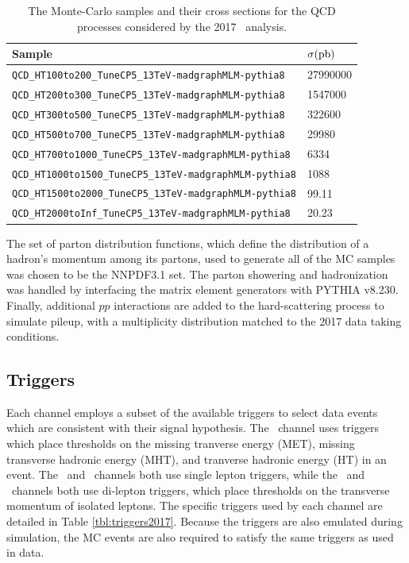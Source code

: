 \begin{table}[htbp]
  \caption[QCD Samples for \VHbb\ 2017]{The Monte-Carlo samples and their cross sections for the QCD processes considered by the 2017 \VHbb\ analysis.}
  \label{tbl:MCQCD}
  \begin{tabularx}{6.5in}{lX}
    \hline
    Sample                                                         & $\sigma (\mathrm{pb})$ \\
    \hline
    \texttt{QCD\_HT100to200\_TuneCP5\_13TeV-madgraphMLM-pythia8}   & 27990000       \\
    \texttt{QCD\_HT200to300\_TuneCP5\_13TeV-madgraphMLM-pythia8}   & 1547000        \\
    \texttt{QCD\_HT300to500\_TuneCP5\_13TeV-madgraphMLM-pythia8}   & 322600         \\
    \texttt{QCD\_HT500to700\_TuneCP5\_13TeV-madgraphMLM-pythia8}   & 29980          \\
    \texttt{QCD\_HT700to1000\_TuneCP5\_13TeV-madgraphMLM-pythia8}  & 6334           \\
    \texttt{QCD\_HT1000to1500\_TuneCP5\_13TeV-madgraphMLM-pythia8} & 1088           \\
    \texttt{QCD\_HT1500to2000\_TuneCP5\_13TeV-madgraphMLM-pythia8} & 99.11          \\
    \texttt{QCD\_HT2000toInf\_TuneCP5\_13TeV-madgraphMLM-pythia8}  & 20.23          \\
    \hline
  \end{tabularx}
\end{table}

The set of parton distribution functions, which define the distribution of a hadron's momentum among its partons, used to generate all of the MC samples was chosen to be the NNPDF3.1\cite{NNPDF} set. The parton showering and hadronization was handled by interfacing the matrix element generators with \textsc{\small PYTHIA} v8.230. Finally, additional $pp$ interactions are added to the hard-scattering process to simulate pileup, with a multiplicity distribution matched to the 2017 data taking conditions.

\subsection{Triggers}

Each channel employs a subset of the available triggers to select data events which are consistent with their signal hypothesis. The \ZnnH\ channel uses triggers which place thresholds on the missing tranverse energy (MET), missing transverse hadronic energy (MHT), and tranverse hadronic energy (HT) in an event. The \WenH\ and \WmnH\ channels both use single lepton triggers, while the \ZeeH\ and \ZmmH\ channels both use di-lepton triggers, which place thresholds on the transverse momentum of isolated leptons. The specific triggers used by each channel are detailed in Table \ref{tbl:triggers2017}. Because the triggers are also emulated during simulation, the MC events are also required to satisfy the same triggers as used in data.

